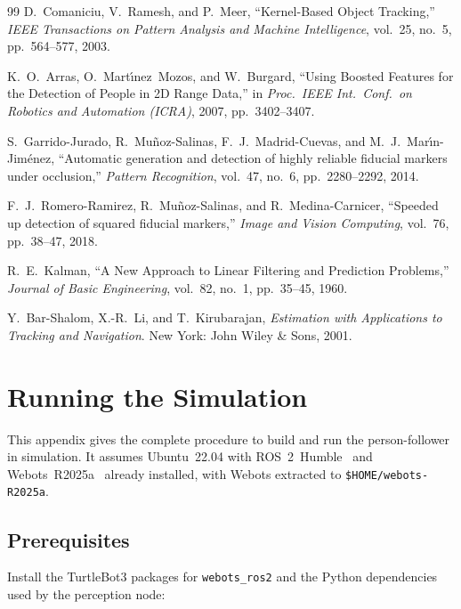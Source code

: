 \documentclass[12pt,a4paper]{article}
\begin{document}
\begin{thebibliography}{99}
D.~Comaniciu, V.~Ramesh, and P.~Meer,
``Kernel-Based Object Tracking,''
\emph{IEEE Transactions on Pattern Analysis and Machine Intelligence},
vol.~25, no.~5, pp.~564--577, 2003.

K.~O.~Arras, O.~Mart\'{\i}nez~Mozos, and W.~Burgard,
``Using Boosted Features for the Detection of People in 2D Range Data,''
in \emph{Proc.\ IEEE Int.\ Conf.\ on Robotics and Automation (ICRA)}, 2007,
pp.~3402--3407.

S.~Garrido-Jurado, R.~Mu\~{n}oz-Salinas, F.~J.~Madrid-Cuevas, and
M.~J.~Mar\'{\i}n-Jim\'{e}nez,
``Automatic generation and detection of highly reliable fiducial markers
under occlusion,''
\emph{Pattern Recognition}, vol.~47, no.~6, pp.~2280--2292, 2014.

F.~J.~Romero-Ramirez, R.~Mu\~{n}oz-Salinas, and R.~Medina-Carnicer,
``Speeded up detection of squared fiducial markers,''
\emph{Image and Vision Computing}, vol.~76, pp.~38--47, 2018.

R.~E.~Kalman,
``A New Approach to Linear Filtering and Prediction Problems,''
\emph{Journal of Basic Engineering}, vol.~82, no.~1, pp.~35--45, 1960.

Y.~Bar-Shalom, X.-R.~Li, and T.~Kirubarajan,
\emph{Estimation with Applications to Tracking and Navigation}.
New York: John Wiley \& Sons, 2001.

\end{thebibliography}

\newpage
\appendix

\section{Running the Simulation}
\label{app:running}

This appendix gives the complete procedure to build and run the
person-follower in simulation. It assumes Ubuntu~22.04 with
ROS~2~Humble~\cite{ros2} and Webots~R2025a~\cite{webots} already installed,
with Webots extracted to \texttt{\$HOME/webots-R2025a}.

\subsection{Prerequisites}

Install the TurtleBot3 packages for \texttt{webots\_ros2} and the Python
dependencies used by the perception node:
\end{document}
